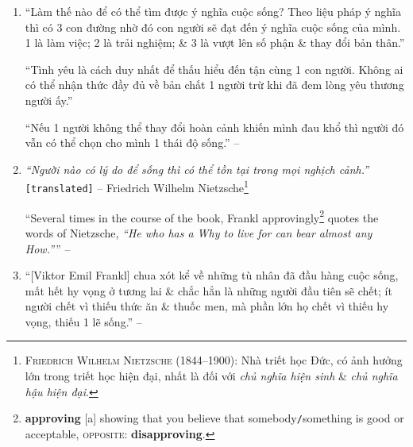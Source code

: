 \documentclass[oneside]{book}
\numberwithin{equation}{section}
\begin{document}
\begin{enumerate}[leftmargin=0mm]
	\item ``Làm thế nào để có thể tìm được ý nghĩa cuộc sống? Theo liệu pháp ý nghĩa thì có 3 con đường nhờ đó con người sẽ đạt đến ý nghĩa cuộc sống của mình. 1 là làm việc; 2 là trải nghiệm; \& 3 là vượt lên số phận \& thay đổi bản thân.''
	
	``Tình yêu là cách duy nhất để thấu hiểu đến tận cùng 1 con người. Không ai có thể nhận thức đầy đủ về bản chất 1 người trừ khi đã đem lòng yêu thương người ấy.''
	
	``Nếu 1 người không thể thay đổi hoàn cảnh khiến mình đau khổ thì người đó vẫn có thể chọn cho mình 1 thái độ sống.'' -- \cite[Bookcover]{Frankl2022}
	\item \textit{``Người nào có \textit{lý do} để sống thì có thể tồn tại trong \textit{mọi} nghịch cảnh.''} \texttt{[translated]} -- Friedrich Wilhelm Nietzsche\footnote{\textsc{Friedrich Wilhelm Nietzsche} (1844--1900): Nhà triết học Đức, có ảnh hưởng lớn trong triết học hiện đại, nhất là đối với \textit{chủ nghĩa hiện sinh} \& \textit{chủ nghĩa hậu hiện đại}.}
	
	``Several times in the course of the book, Frankl approvingly\footnote{\textbf{approving} [a] showing that you believe that somebody\texttt{/}something is good or acceptable, \textsc{opposite}: \textbf{disapproving}.} quotes the words of Nietzsche, \textit{``He who has a Why to live for can bear almost any How.''}\,'' -- \cite[Preface by \textsc{Harold S. Kushner}, p. 9]{Frankl2013}
	\item ``[Viktor Emil Frankl] chua xót kể về những tù nhân đã đầu hàng cuộc sống, mất hết hy vọng ở tương lai \& chắc hẳn là những người đầu tiên sẽ chết; ít người chết vì thiếu thức ăn \& thuốc men, mà phần lớn họ chết vì thiếu hy vọng, thiếu 1 lẽ sống.'' -- \cite[p. 6]{Frankl2022}
	

\end{enumerate}
\end{document}
